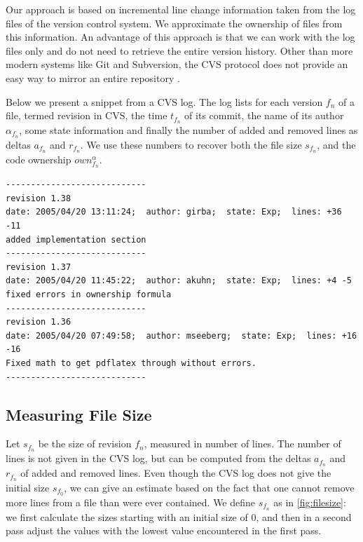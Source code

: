 Our approach is based on incremental line change information taken from the log files of the version control system. We approximate the ownership of files from this information. An advantage of this approach is that we can work with the log files only and do not need to retrieve the entire version history. Other than more modern systems like Git and Subversion, the CVS protocol does not provide an easy way to mirror an entire repository \cite{citeulike:5416084}.  

Below we present a snippet from a CVS log. The log lists for each version $f_n$ of a file, termed revision in CVS, the time $t_{f_n}$ of its commit, the name of its author $\alpha_{f_n}$, some state information and finally the number of added and removed lines as deltas $a_{f_n}$ and $r_{f_n}$. We use these numbers to recover both the file size $s_{f_n}$, and the code ownership $own_{f_n}^\alpha$.

\begin{tiny}\begin{verbatim}
----------------------------
revision 1.38
date: 2005/04/20 13:11:24;  author: girba;  state: Exp;  lines: +36 -11
added implementation section
----------------------------
revision 1.37
date: 2005/04/20 11:45:22;  author: akuhn;  state: Exp;  lines: +4 -5
fixed errors in ownership formula
----------------------------
revision 1.36
date: 2005/04/20 07:49:58;  author: mseeberg;  state: Exp;  lines: +16 -16
Fixed math to get pdflatex through without errors.
----------------------------
\end{verbatim}\end{tiny}

\subsection{Measuring File Size}

Let $s_{f_n}$ be the size of revision $f_n$, measured in number of lines. The number of lines is not given in the CVS log, but can be computed from the deltas $a_{f_n}$ and $r_{f_n}$ of added and removed lines. Even though the CVS log does not give the initial size $s_{f_0}$, we can give an estimate based on the fact that one cannot remove more lines from a file than were ever contained. We define $s_{f_n}$ as in \autoref{fig:filesize}: we first calculate the sizes starting with an initial size of 0, and then in a second pass adjust the values with the lowest value encountered in the first pass.

